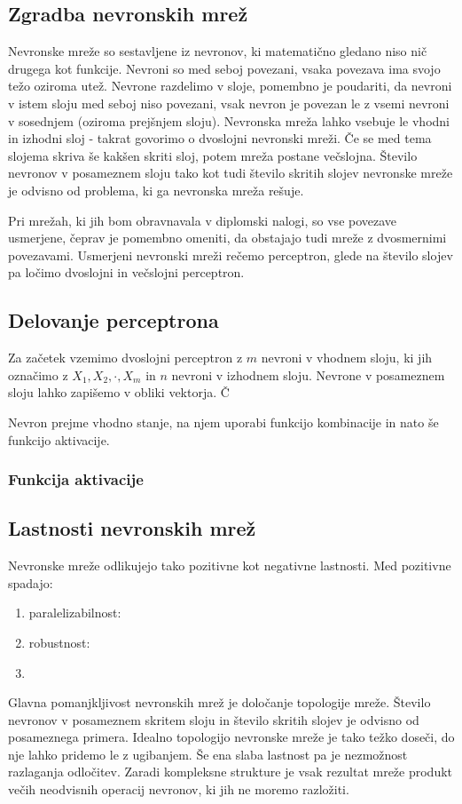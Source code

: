 \documentclass[mat1]{fmfdelo}
\begin{document}


\subsection{Zgradba nevronskih mrež}
Nevronske mreže so sestavljene iz nevronov, ki matematično gledano niso nič drugega kot funkcije. Nevroni so med seboj povezani, vsaka povezava ima svojo težo oziroma utež. Nevrone razdelimo v sloje, pomembno je poudariti, da nevroni v istem sloju med seboj niso povezani, vsak nevron je povezan le z vsemi nevroni v sosednjem (oziroma prejšnjem sloju). Nevronska mreža lahko vsebuje le vhodni in izhodni sloj - takrat govorimo o dvoslojni nevronski mreži. Če se med tema slojema skriva še kakšen skriti sloj, potem mreža postane večslojna. Število nevronov v posameznem sloju tako kot tudi število skritih slojev nevronske mreže je odvisno od problema, ki ga nevronska mreža rešuje.


Pri mrežah, ki jih bom obravnavala v diplomski nalogi, so vse povezave usmerjene, čeprav je pomembno omeniti, da obstajajo tudi mreže z dvosmernimi povezavami. Usmerjeni nevronski mreži rečemo perceptron, glede na število slojev pa ločimo dvoslojni in večslojni perceptron.

\subsection{Delovanje perceptrona}
Za začetek vzemimo dvoslojni perceptron z $m$ nevroni v vhodnem sloju, ki jih označimo z $X_1, X_2, \cdot, X_m$ in $n$ nevroni v izhodnem sloju. Nevrone v posameznem sloju lahko zapišemo v obliki vektorja. Č


Nevron prejme vhodno stanje, na njem uporabi funkcijo kombinacije in nato še funkcijo aktivacije.

\subsubsection{Funkcija aktivacije}




\subsection{Lastnosti nevronskih mrež}
Nevronske mreže odlikujejo tako pozitivne kot negativne lastnosti. Med pozitivne spadajo:
\begin{enumerate}
\item paralelizabilnost:
\item robustnost:
\item 
\end{enumerate}
Glavna pomanjkljivost nevronskih mrež je določanje topologije mreže. Število nevronov v posameznem skritem sloju in število skritih slojev je odvisno od posameznega primera. Idealno topologijo nevronske mreže je tako težko doseči, do nje lahko pridemo le z ugibanjem. Še ena slaba lastnost pa je nezmožnost razlaganja odločitev. Zaradi kompleksne strukture je vsak rezultat mreže produkt večih neodvisnih operacij nevronov, ki jih ne moremo razložiti.
\end{document}
